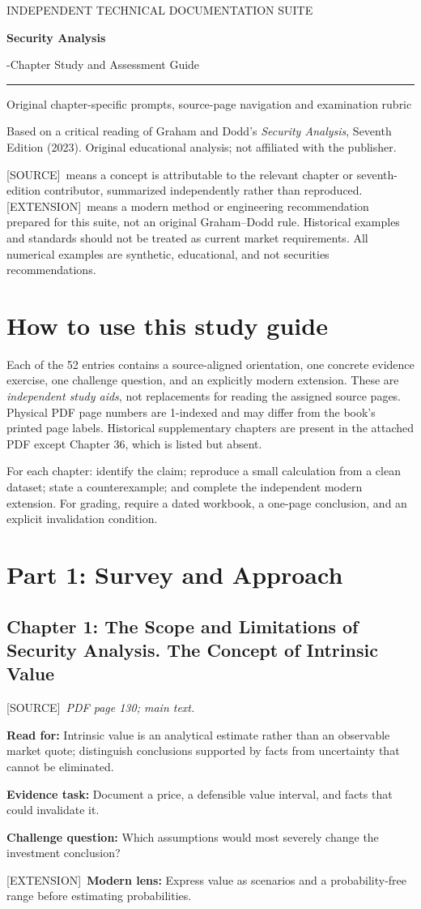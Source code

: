 \documentclass[11pt,letterpaper]{article}
\newcommand{\src}{\textsf{\color{sea}[SOURCE]}}
\newcommand{\ext}{\textsf{\color{gold}[EXTENSION]}}
\newcommand{\cover}[3]{%
\hypersetup{pageanchor=false}%
\begin{titlepage}\pagecolor{ink}\color{white}\vspace*{1.15in}
{\sffamily\large\color{gold}INDEPENDENT TECHNICAL DOCUMENTATION SUITE\par}\vspace{0.4in}
{\Huge\sffamily\bfseries #1\par}\vspace{0.15in}
{\Large\sffamily #2\par}\vspace{0.65in}
\color{gold}\rule{\textwidth}{2pt}\par\vspace{0.4in}
{\large #3\par}\vfill
{\small\sffamily Based on a critical reading of Graham and Dodd's \emph{Security Analysis}, Seventh Edition (2023). Original educational analysis; not affiliated with the publisher.\par}
\end{titlepage}\hypersetup{pageanchor=true}\nopagecolor\color{black}}
\newcommand{\front}[3]{\cover{#1}{#2}{#3}\tableofcontents\clearpage
\begin{sourcebox}\src\ means a concept is attributable to the relevant chapter or seventh-edition contributor, summarized independently rather than reproduced. \ext\ means a modern method or engineering recommendation prepared for this suite, not an original Graham--Dodd rule. Historical examples and standards should not be treated as current market requirements. All numerical examples are synthetic, educational, and not securities recommendations.\end{sourcebox}}
\begin{document}
\front{Security Analysis}{52-Chapter Study and Assessment Guide}{Original chapter-specific prompts, source-page navigation and examination rubric}
\section{How to use this study guide}
Each of the 52 entries contains a source-aligned orientation, one concrete evidence exercise, one challenge question, and an explicitly modern extension. These are \emph{independent study aids}, not replacements for reading the assigned source pages. Physical PDF page numbers are 1-indexed and may differ from the book's printed page labels. Historical supplementary chapters are present in the attached PDF except Chapter 36, which is listed but absent.
\begin{methodbox}For each chapter: identify the claim; reproduce a small calculation from a clean dataset; state a counterexample; and complete the independent modern extension. For grading, require a dated workbook, a one-page conclusion, and an explicit invalidation condition.\end{methodbox}

\section{Part 1: Survey and Approach}

\subsection{Chapter 1: The Scope and Limitations of Security Analysis. The Concept of Intrinsic Value}
\src\ \textit{PDF page 130; main text.}\par
\textbf{Read for:} Intrinsic value is an analytical estimate rather than an observable market quote; distinguish conclusions supported by facts from uncertainty that cannot be eliminated.\par
\textbf{Evidence task:} Document a price, a defensible value interval, and facts that could invalidate it.\par
\textbf{Challenge question:} Which assumptions would most severely change the investment conclusion?\par
\ext\ \textbf{Modern lens:} Express value as scenarios and a probability-free range before estimating probabilities.\par
\end{document}
